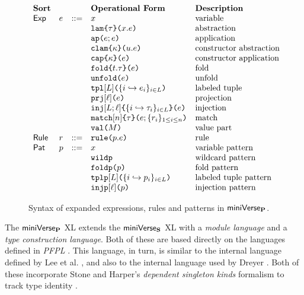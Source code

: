\begin{figure}
\[\begin{array}{lllllll}
\textbf{Sort} & & & \textbf{Operational Form} 
& \textbf{Description}\\
\mathsf{Exp} & e & ::= & x 
& \text{variable}\\
&&& \aelam{\tau}{x}{e} 
& \text{abstraction}\\
&&& \aeap{e}{e} 
& \text{application}\\
&&& \aeclam{\kappa}{u}{e} %
& \text{constructor abstraction}\\
&&& \aecap{e}{\kappa} %
& \text{constructor application}\\
&&& \aefold{t}{\tau}{e} %
& \text{fold}\\
&&& \aeunfold{e} %
& \text{unfold}\\
&&& \aetpl{\labelset}{\mapschema{e}{i}{\labelset}} 
& \text{labeled tuple}\\
&&& \aepr{\ell}{e} 
& \text{projection}\\
&&& \aein{\labelset}{\ell}{\mapschema{\tau}{i}{\labelset}}{e} 
& \text{injection}\\
&&& \aematchwith{n}{\tau}{e}{\seqschemaX{r}} 
& \text{match}\\
&&& \amval{M} 
& \text{value part}\\
\mathsf{Rule} & r & ::= & \aematchrule{p}{e} 
& \text{rule}\\
\mathsf{Pat} & p & ::= & x 
& \text{variable pattern}\\
&&& \aewildp 
& \text{wildcard pattern}\\
&&& \aefoldp{p} 
& \text{fold pattern}\\
&&& \aetplp{\labelset}{\mapschema{p}{i}{\labelset}} 
& \text{labeled tuple pattern}\\
&&& \aeinjp{\ell}{p} 
& \text{injection pattern}
\end{array}\]
\caption[Syntax of expanded expressions, rules and patterns in $\miniVerseParam$]{Syntax of expanded expressions, rules and patterns in $\miniVerseParam$.}
\label{fig:P-expanded-terms}
\end{figure}
The $\miniVerseParam$ XL extends the $\mathsf{miniVerse}_\textbf{S}$ XL with a \emph{module language} and a \emph{type construction language}. Both of these are based directly on the languages defined in \emph{PFPL} \cite{pfpl}. This language, in turn, is similar to the internal language defined by Lee et al. \cite{conf/popl/LeeCH07}, and also to the internal language used by Dreyer \cite{dreyer2005understanding}. Both of these incorporate Stone and Harper's \emph{dependent singleton kinds} formalism to track type identity \cite{stone2006extensional}.


